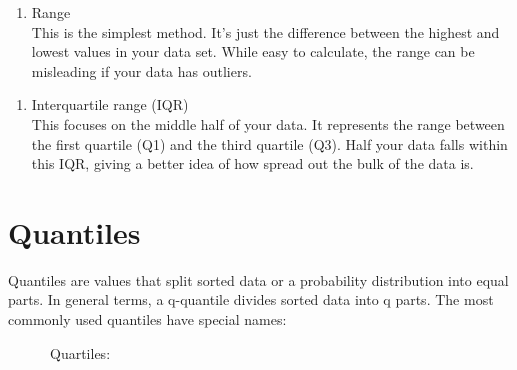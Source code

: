 \documentclass[
]{book}
\newenvironment{Shaded}{\begin{snugshade}}{\end{snugshade}}
\newcommand{\CommentTok}[1]{\textcolor[rgb]{0.56,0.35,0.01}{\textit{#1}}}
\newcommand{\FunctionTok}[1]{\textcolor[rgb]{0.13,0.29,0.53}{\textbf{#1}}}
\newcommand{\NormalTok}[1]{#1}
\newcommand{\SpecialCharTok}[1]{\textcolor[rgb]{0.81,0.36,0.00}{\textbf{#1}}}
\providecommand{\tightlist}{%
  \setlength{\itemsep}{0pt}\setlength{\parskip}{0pt}}
\begin{document}
\begin{enumerate}
\def\labelenumi{\arabic{enumi}.}
\setcounter{enumi}{2}
\tightlist
\item
  Range\\
  This is the simplest method. It's just the difference between the highest and lowest values in your data set. While easy to calculate, the range can be misleading if your data has outliers.
\end{enumerate}

\begin{Shaded}
\end{Shaded}

\begin{enumerate}
\def\labelenumi{\arabic{enumi}.}
\setcounter{enumi}{3}
\tightlist
\item
  Interquartile range (IQR)\\
  This focuses on the middle half of your data. It represents the range between the first quartile (Q1) and the third quartile (Q3). Half your data falls within this IQR, giving a better idea of how spread out the bulk of the data is.
\end{enumerate}

\begin{Shaded}
\end{Shaded}

\hypertarget{quantiles}{%
\section{Quantiles}\label{quantiles}}

Quantiles are values that split sorted data or a probability distribution into equal parts. In general terms, a q-quantile divides sorted data into q parts. The most commonly used quantiles have special names:

~~~~~~Quartiles:

\begin{Shaded}
\end{Shaded}
\end{document}
